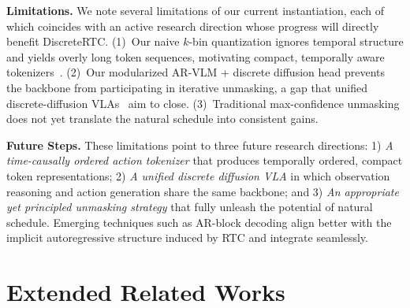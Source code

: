 \documentclass{article}
\begin{document}
\textbf{Limitations.}
We note several limitations of our current instantiation, each of which coincides with an active research direction whose progress will directly benefit DiscreteRTC.
(1)~Our naive $k$-bin quantization ignores temporal structure and yields overly long token sequences, motivating compact, temporally aware tokenizers~\citep{pertsch2025fast, liu2026oat}.
(2)~Our modularized AR-VLM + discrete diffusion head prevents the backbone from participating in iterative unmasking, a gap that unified discrete-diffusion VLAs~\citep{wen2025llada, wen2025dvla, chen2025unified, ye2025dream} aim to close.
(3)~Traditional max-confidence unmasking does not yet translate the natural schedule into consistent gains.

\textbf{Future Steps.}
These limitations point to three future research directions: 1) \emph{A time-causally ordered action tokenizer} that produces temporally ordered, compact token representations; 2) \emph{A unified discrete diffusion VLA} in which observation reasoning and action generation share the same backbone; and 3) \emph{An appropriate yet principled unmasking strategy} that fully unleash the potential of natural schedule. Emerging techniques such as AR-block decoding align better with the implicit autoregressive structure induced by RTC and integrate seamlessly.










\newpage
\appendix
\section{Extended Related Works}
\label{app:related}
\end{document}
